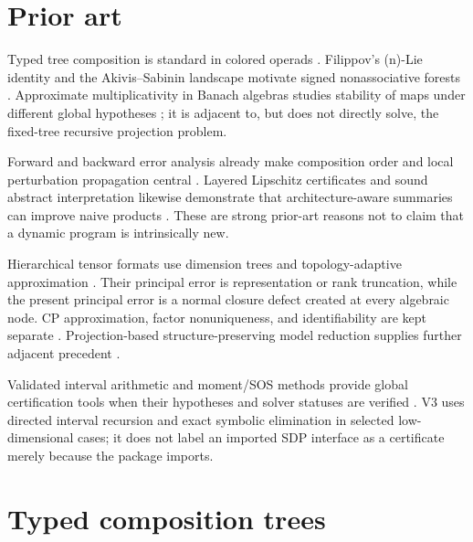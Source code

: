\documentclass[11pt]{amsart}
\theoremstyle{definition}
\theoremstyle{remark}
\begin{document}
\section{Prior art}

Typed tree composition is standard in colored operads
\cite{Yau2016,LodayVallette2012}.  Filippov's (n)-Lie identity and the
Akivis--Sabinin landscape motivate signed nonassociative forests
\cite{Filippov1985,MostovoyPerezIzquierdoShestakov2014}.  Approximate
multiplicativity in Banach algebras studies stability of maps under different
global hypotheses \cite{Johnson1988}; it is adjacent to, but does not directly
solve, the fixed-tree recursive projection problem.

Forward and backward error analysis already make composition order and local
perturbation propagation central \cite{Higham2002}.  Layered Lipschitz
certificates and sound abstract interpretation likewise demonstrate that
architecture-aware summaries can improve naive products
\cite{CombettesPesquet2020,GehrEtAl2018}.  These are strong prior-art reasons
not to claim that a dynamic program is intrinsically new.

Hierarchical tensor formats use dimension trees and topology-adaptive
approximation \cite{HackbuschKuhn2009,BallaniGrasedyck2014}.  Their principal
error is representation or rank truncation, while the present principal error
is a normal closure defect created at every algebraic node.  CP approximation,
factor nonuniqueness, and identifiability are kept separate
\cite{KoldaBader2009,Kruskal1977}.  Projection-based structure-preserving
model reduction supplies further adjacent precedent \cite{EggerEtAl2018}.

Validated interval arithmetic and moment/SOS methods provide global
certification tools when their hypotheses and solver statuses are verified
\cite{MooreKearfottCloud2009,Lasserre2001}.  V3 uses directed interval
recursion and exact symbolic elimination in selected low-dimensional cases;
it does not label an imported SDP interface as a certificate merely because
the package imports.

\begin{table}[p]
\centering\scriptsize
\caption{Prior-art overlap matrix generated from the v3 registry.  A bounded search cannot establish novelty.}
\label{tab:prior}
\resizebox{\textwidth}{!}{}
\end{table}

\section{Typed composition trees}
\end{document}
